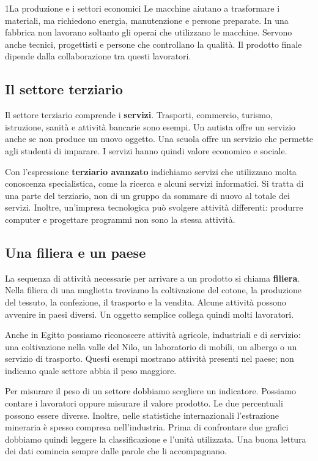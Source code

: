 \begin{lettura}{1}{La produzione e i settori economici}
Le macchine aiutano a trasformare i materiali, ma richiedono energia, manutenzione e persone preparate. In una fabbrica non lavorano soltanto gli operai che utilizzano le macchine. Servono anche tecnici, progettisti e persone che controllano la qualità. Il prodotto finale dipende dalla collaborazione tra questi lavoratori.

\subsection*{Il settore terziario}
Il settore terziario comprende i \textbf{servizi}. Trasporti, commercio, turismo, istruzione, sanità e attività bancarie sono esempi. Un autista offre un servizio anche se non produce un nuovo oggetto. Una scuola offre un servizio che permette agli studenti di imparare. I servizi hanno quindi valore economico e sociale.

Con l'espressione \textbf{terziario avanzato} indichiamo servizi che utilizzano molta conoscenza specialistica, come la ricerca e alcuni servizi informatici. Si tratta di una parte del terziario, non di un gruppo da sommare di nuovo al totale dei servizi. Inoltre, un'impresa tecnologica può svolgere attività differenti: produrre computer e progettare programmi non sono la stessa attività.

\subsection*{Una filiera e un paese}
La sequenza di attività necessarie per arrivare a un prodotto si chiama \textbf{filiera}. Nella filiera di una maglietta troviamo la coltivazione del cotone, la produzione del tessuto, la confezione, il trasporto e la vendita. Alcune attività possono avvenire in paesi diversi. Un oggetto semplice collega quindi molti lavoratori.

Anche in Egitto possiamo riconoscere attività agricole, industriali e di servizio: una coltivazione nella valle del Nilo, un laboratorio di mobili, un albergo o un servizio di trasporto. Questi esempi mostrano attività presenti nel paese; non indicano quale settore abbia il peso maggiore.

Per misurare il peso di un settore dobbiamo scegliere un indicatore. Possiamo contare i lavoratori oppure misurare il valore prodotto. Le due percentuali possono essere diverse. Inoltre, nelle statistiche internazionali l'estrazione mineraria è spesso compresa nell'industria. Prima di confrontare due grafici dobbiamo quindi leggere la classificazione e l'unità utilizzata. Una buona lettura dei dati comincia sempre dalle parole che li accompagnano.



\end{lettura}
